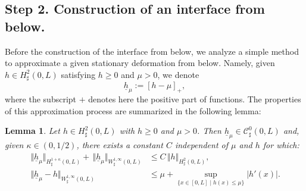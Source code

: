 \documentclass[JEP,XML,SOM,Unicode,NoFloatCountersInSection]{cedram}
\let\mathcal\mathscr
\newtheorem{lemma}[theorem]{Lemma}
\theoremstyle{remark}
\theoremstyle{definition}
\newcommand{\norme}[1]{\,\Vert #1\Vert}
\newcommand{\hb}{{\underline{h}}}
\begin{document}
\subsection{Step 2. Construction of an interface from below.}
Before the construction of the interface from below, we analyze a simple method to approximate a given stationary deformation from below. Namely, given $h \in H^2_{\sharp}(0,L)$ satisfying $h \geq 0$ and $\mu >0$, we denote
\[
\hb_{\mu} := [h-\mu]_{+},
\]
where the subscript $+$ denotes here the positive part of functions. The properties of this approximation process
are summarized in the following lemma:
\begin{lemma}\label{lemma.halpha}
Let $h \in H^{2}_{\sharp}(0,L)$ with $h \geq 0$ and $\mu >0$.
Then $\hb_{\mu}\in \mathcal{C}_\sharp^{0}(0,L)$ and, given $\kappa \in (0,1/2)$, there exists a constant $C$
independent of $\mu$ and $h$ for which:
\begin{align}
\norme{\hb_{\mu}}_{H_\sharp^{1+\kappa}(0,L)} + \norme{\hb_{\mu}}_{W^{1,\infty}_\sharp(0,L)}&\leq C\norme{h}_{H_\sharp^{2}(0,L)}, \label{h1}\\
\norme{\hb_{\mu}-h}_{W_\sharp^{1, \infty}(0,L)}&\leq {\mu}+\sup_{\{x\in[0, L]\mid h(x)\leq \mu\}}\vert h'(x)\vert.\label{h2}
\end{align}
\end{lemma}
\end{document}
